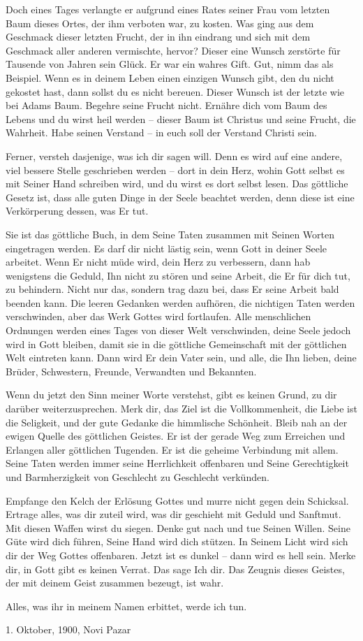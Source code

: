 Doch eines Tages verlangte er aufgrund eines Rates seiner Frau vom letzten Baum dieses Ortes, der ihm verboten war, zu kosten. Was ging aus dem Geschmack dieser letzten Frucht, der in ihn eindrang und sich mit dem Geschmack aller anderen vermischte, hervor? Dieser eine Wunsch zerstörte für Tausende von Jahren sein Glück. Er war ein wahres Gift. Gut, nimm das als Beispiel. Wenn es in deinem Leben einen einzigen Wunsch gibt, den du nicht gekostet hast, dann sollst du es nicht bereuen. Dieser Wunsch ist der letzte wie bei Adams Baum. Begehre seine Frucht nicht. Ernähre dich vom Baum des Lebens und du wirst heil werden -- dieser Baum ist Christus und seine Frucht, die Wahrheit. Habe seinen Verstand -- in euch soll der Verstand Christi sein.

Ferner, versteh dasjenige, was ich dir sagen will. Denn es wird auf eine andere, viel bessere Stelle geschrieben werden -- dort in dein Herz, wohin Gott selbst es mit Seiner Hand schreiben wird, und du wirst es dort selbst lesen. Das göttliche Gesetz ist, dass alle guten Dinge in der Seele beachtet werden, denn diese ist eine Verkörperung dessen, was Er tut.

Sie ist das göttliche Buch, in dem Seine Taten zusammen mit Seinen Worten eingetragen werden. Es darf dir nicht lästig sein, wenn Gott in deiner Seele arbeitet. Wenn Er nicht müde wird, dein Herz zu verbessern, dann hab wenigstens die Geduld, Ihn nicht zu stören und seine Arbeit, die Er für dich tut, zu behindern. Nicht nur das, sondern trag dazu bei, dass Er seine Arbeit bald beenden kann. Die leeren Gedanken werden aufhören, die nichtigen Taten werden verschwinden, aber das Werk Gottes wird fortlaufen. Alle menschlichen Ordnungen werden eines Tages von dieser Welt verschwinden, deine Seele jedoch wird in Gott bleiben, damit sie in die göttliche Gemeinschaft mit der göttlichen Welt eintreten kann. Dann wird Er dein Vater sein, und alle, die Ihn lieben, deine Brüder, Schwestern, Freunde, Verwandten und Bekannten. 

Wenn du jetzt den Sinn meiner Worte verstehst, gibt es keinen Grund, zu dir darüber weiterzusprechen. Merk dir, das Ziel ist die Vollkommenheit, die Liebe ist die Seligkeit, und der gute Gedanke die himmlische Schönheit. Bleib nah an der ewigen Quelle des göttlichen Geistes. Er ist der gerade Weg zum Erreichen und Erlangen aller göttlichen Tugenden. Er ist die geheime Verbindung mit allem. Seine Taten werden immer seine Herrlichkeit offenbaren und Seine Gerechtigkeit und Barmherzigkeit von Geschlecht zu Geschlecht verkünden. 

Empfange den Kelch der Erlösung Gottes und murre nicht gegen dein Schicksal. Ertrage alles, was dir zuteil wird, was dir geschieht mit Geduld und Sanftmut. Mit diesen Waffen wirst du siegen. Denke gut nach und tue Seinen Willen. Seine Güte wird dich führen, Seine Hand wird dich stützen. In Seinem Licht wird sich dir der Weg Gottes offenbaren. Jetzt ist es dunkel -- dann wird es hell sein. Merke dir, in Gott gibt es keinen Verrat. Das sage Ich dir. Das Zeugnis dieses Geistes, der mit deinem Geist zusammen bezeugt, ist wahr.

Alles, was ihr in meinem Namen erbittet, werde ich tun.

1. Oktober, 1900, Novi Pazar

